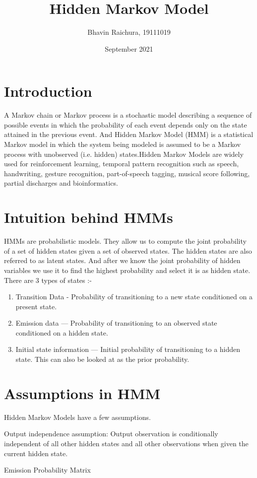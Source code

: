 \documentclass{article}
\title{Hidden Markov Model}
\author{Bhavin Raichura, 19111019}
\date{September 2021}
\begin{document}
\maketitle



\section{Introduction}
A Markov chain or Markov process is a stochastic model describing a sequence of possible events in which the probability of each event depends only on the state attained in the previous event. And Hidden Markov Model (HMM) is a statistical Markov model in which the system being modeled is assumed to be a Markov process with unobserved (i.e. hidden) states.Hidden Markov Models are widely used for reinforcement learning, temporal pattern recognition such as speech, handwriting, gesture recognition, part-of-speech tagging, musical score following, partial discharges and bioinformatics.

\section{Intuition behind HMMs}
HMMs are probabilistic models. They allow us to compute the joint probability of a set of hidden states given a set of observed states. The hidden states are also referred to as latent states. And after we know the joint probability of hidden variables we use it to find the highest probability and select it is as hidden state.
\\
There are 3 types of states :-
\begin{enumerate}
\item Transition Data - Probability of transitioning to a new state conditioned on a present state.
\item Emission data — Probability of transitioning to an observed state conditioned on a hidden state.
\item Initial state information — Initial probability of transitioning to a hidden state. This can also be looked at as the prior probability. 
\end{enumerate}

\section{Assumptions in HMM}
\item
Hidden Markov Models have a few assumptions.
\item
Output independence assumption: Output observation is conditionally independent of all other hidden states and all other observations when given the current hidden state.
\item
Emission Probability Matrix 
\end{document}

